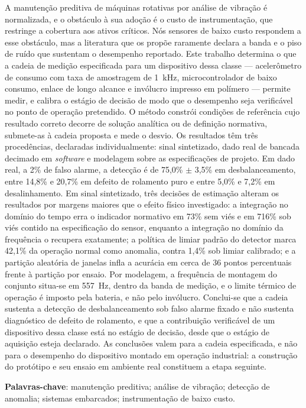
\begin{resumo}
A manutenção preditiva de máquinas rotativas por análise de vibração é normalizada, e o
obstáculo à sua adoção é o custo de instrumentação, que restringe a cobertura aos ativos
críticos. Nós sensores de baixo custo respondem a esse obstáculo, mas a literatura que os
propõe raramente declara a banda e o piso de ruído que sustentam o desempenho reportado.
Este trabalho determina o que a cadeia de medição especificada para um dispositivo dessa
classe --- acelerômetro de consumo com taxa de amostragem de 1~kHz, microcontrolador de
baixo consumo, enlace de longo alcance e invólucro impresso em polímero --- permite medir,
e calibra o estágio de decisão de modo que o desempenho seja verificável no ponto de
operação pretendido. O método constrói condições de referência cujo resultado correto
decorre de solução analítica ou de definição normativa, submete-as à cadeia proposta e mede
o desvio. Os resultados têm três procedências, declaradas individualmente: sinal
sintetizado, dado real de bancada decimado em \emph{software} e modelagem sobre as
especificações de projeto. Em dado real, a 2\% de falso alarme, a detecção é de
75,0\% $\pm$ 3,5\% em desbalanceamento, entre 14,8\% e 20,7\% em defeito de rolamento puro
e entre 5,0\% e 7,2\% em desalinhamento. Em sinal sintetizado, três decisões de estimação
alteram os resultados por margens maiores que o efeito físico investigado: a integração no
domínio do tempo erra o indicador normativo em 73\% sem viés e em 716\% sob viés contido na
especificação do sensor, enquanto a integração no domínio da frequência o recupera
exatamente; a política de limiar padrão do detector marca 42,1\% da operação normal como
anomalia, contra 1,4\% sob limiar calibrado; e a partição aleatória de janelas infla a
acurácia em cerca de 36 pontos percentuais frente à partição por ensaio. Por modelagem, a
frequência de montagem do conjunto situa-se em 557~Hz, dentro da banda de medição, e o
limite térmico de operação é imposto pela bateria, e não pelo invólucro. Conclui-se que a
cadeia sustenta a detecção de desbalanceamento sob falso alarme fixado e não sustenta
diagnóstico de defeito de rolamento, e que a contribuição verificável de um dispositivo
dessa classe está no estágio de decisão, desde que o estágio de aquisição esteja declarado.
As conclusões valem para a cadeia especificada, e não para o desempenho do dispositivo
montado em operação industrial: a construção do protótipo e seu ensaio em ambiente real
constituem a etapa seguinte.

\vspace{\onelineskip}
\noindent
\textbf{Palavras-chave}: manutenção preditiva; análise de vibração; detecção de anomalia;
sistemas embarcados; instrumentação de baixo custo.
\end{resumo}
